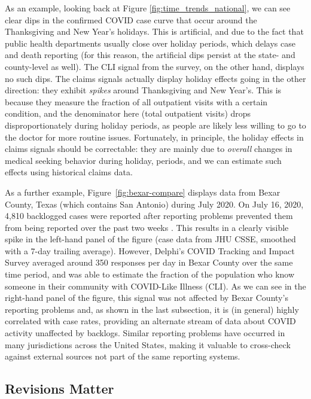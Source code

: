 \documentclass[9pt,twocolumn,twoside,lineno]{pnas-new}
\begin{document}
As an example, looking back at Figure \ref{fig:time_trends_national}, we can see
clear dips in the confirmed COVID case curve that occur around the Thanksgiving
and New Year's holidays. This is artificial, and due to the fact that public
health departments usually close over holiday periods, which delays case and
death reporting (for this reason, the artificial dips persist at the state- and
county-level as well). The CLI signal from the survey, on the other hand,
displays no such dips. The claims signals actually display holiday effects going
in the other direction: they exhibit \textit{spikes} around Thanksgiving and New
Year's. This is because they measure the fraction of all outpatient visits with
a certain condition, and the denominator here (total outpatient visits) drops
disproportionately during holiday periods, as people are likely less willing to
go to the doctor for more routine issues. Fortunately, in principle, the holiday
effects in claims signals should be correctable: they are mainly due to
\textit{overall} changes in medical seeking behavior during holiday, periods,
and we can estimate such effects using historical claims data.

As a further example, Figure~\ref{fig:bexar-compare} displays data from Bexar
County, Texas (which contains San Antonio) during July 2020. On July 16, 2020,
4,810 backlogged cases were reported after reporting problems prevented them
from being reported over the past two weeks \cite{Palacios:2021}. This results
in a clearly visible spike in the left-hand panel of the figure (case data from
JHU CSSE, smoothed with a 7-day trailing average).  However, Delphi's COVID
Tracking and Impact Survey averaged around 350 responses per day in Bexar
County over the same time period, and was able to estimate the fraction
of the population who know someone in their community with COVID-Like Illness
(CLI). As we can see in the right-hand panel of the figure, this signal was not
affected by Bexar County's reporting problems and, as shown in the last
subsection, it is (in general) highly correlated with case rates, providing an
alternate stream of data about COVID activity unaffected by backlogs. Similar
reporting problems have occurred in many jurisdictions across the United States,
making it valuable to cross-check against external sources not part of the same
reporting systems.

\subsection{Revisions Matter}
\end{document}
